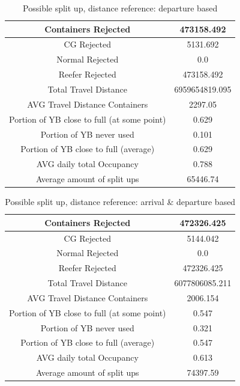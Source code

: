 \documentclass{article}
\begin{document}
\begin{table}[h]
    \centering
    \begin{tabular}{|c|c|}
        \hline
        Containers Rejected                         & 473158.492     \\ \hline
        CG Rejected                                 & 5131.692       \\ \hline
        Normal Rejected                             & 0.0            \\ \hline
        Reefer Rejected                             & 473158.492     \\ \hline
        Total Travel Distance                       & 6959654819.095 \\ \hline
        AVG Travel Distance Containers              & 2297.05        \\ \hline
        Portion of YB close to full (at some point) & 0.629          \\ \hline
        Portion of YB never used                    & 0.101          \\ \hline
        Portion of YB close to full (average)       & 0.629          \\ \hline
        AVG daily total Occupancy                   & 0.788          \\ \hline
        Average amount of split ups                 & 65446.74       \\ \hline
    \end{tabular}
    \caption{Possible split up, distance reference: departure based}
\end{table}

\begin{table}[h]
    \centering
    \begin{tabular}{|c|c|}
        \hline
        Containers Rejected                         & 472326.425     \\ \hline
        CG Rejected                                 & 5144.042       \\ \hline
        Normal Rejected                             & 0.0            \\ \hline
        Reefer Rejected                             & 472326.425     \\ \hline
        Total Travel Distance                       & 6077806085.211 \\ \hline
        AVG Travel Distance Containers              & 2006.154       \\ \hline
        Portion of YB close to full (at some point) & 0.547          \\ \hline
        Portion of YB never used                    & 0.321          \\ \hline
        Portion of YB close to full (average)       & 0.547          \\ \hline
        AVG daily total Occupancy                   & 0.613          \\ \hline
        Average amount of split ups                 & 74397.59       \\ \hline
    \end{tabular}
    \caption{Possible split up, distance reference: arrival \& departure based}
\end{table}
\end{document}
